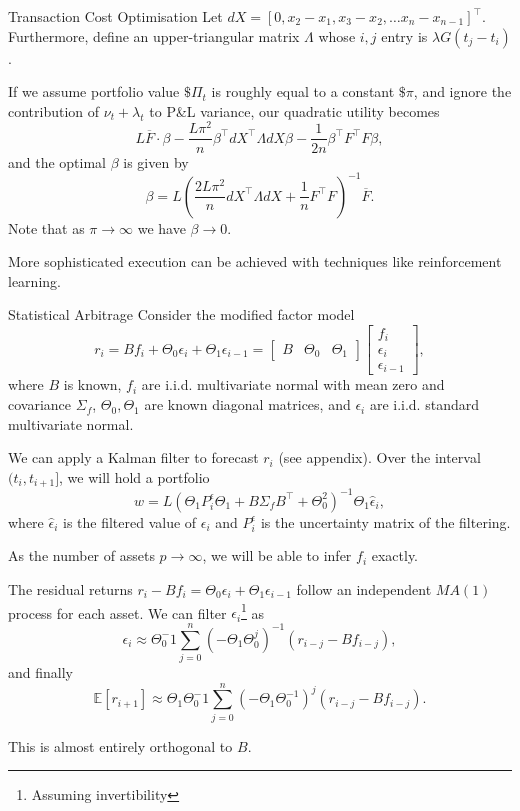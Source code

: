 \documentclass{beamer}
\begin{document}
\begin{frame}{Transaction Cost Optimisation}
	Let $dX = [0,x_2-x_1,x_3-x_2,\ldots x_n-x_{n-1}]^\top$. Furthermore, define an upper-triangular matrix $\Lambda$ whose $i,j$ entry is $\lambda G(t_j-t_i)$.

	If we assume portfolio value $\$\Pi_t$ is roughly equal to a constant $\$\pi$, and ignore the contribution of $\nu_t+\lambda_t$ to P\&L variance, our quadratic utility becomes
	$$L\overline{F} \cdot \beta - \frac{L\pi^2}{n}\beta^\top dX^\top \Lambda dX\beta - \frac{1}{2n}\beta^\top F^\top F\beta,$$
	and the optimal $\beta$ is given by
	$$\beta = L\left(\frac{2L\pi^2}{n} dX^\top \Lambda dX + \frac{1}{n}F^\top F\right)^{-1}\overline{F}.$$
	Note that as $\pi\to\infty$ we have $\beta\to 0$.

	More sophisticated execution can be achieved with techniques like reinforcement learning.
\end{frame}

\begin{frame}{Statistical Arbitrage}
	Consider the modified factor model
	$$r_i = Bf_i + \Theta_0\epsilon_i + \Theta_1\epsilon_{i-1} = \left[\begin{matrix}B & \Theta_0 & \Theta_1\end{matrix}\right]\left[\begin{matrix}f_i \\ \epsilon_i \\ \epsilon_{i-1}\end{matrix}\right],$$
	where $B$ is known, $f_i$ are i.i.d. multivariate normal with mean zero and covariance $\Sigma_f$, $\Theta_0,\Theta_1$ are known diagonal matrices, and $\epsilon_i$ are i.i.d. standard multivariate normal.

	We can apply a Kalman filter to forecast $r_i$ (see appendix). Over the interval $(t_i,t_{i+1}]$, we will hold a portfolio
	$$w = L(\Theta_1 P^\epsilon_i \Theta_1 + B\Sigma_f B^\top + \Theta_0^2)^{-1} \Theta_1\hat{\epsilon}_i,$$
	where $\hat{\epsilon}_i$ is the filtered value of $\epsilon_i$ and $P^\epsilon_i$ is the uncertainty matrix of the filtering.

	As the number of assets $p\to\infty$, we will be able to infer $f_i$ exactly.

	The residual returns $r_i-Bf_i = \Theta_0\epsilon_i + \Theta_1 \epsilon_{i-1}$ follow an independent $MA(1)$ process for each asset. We can filter $\epsilon_i$\footnote{Assuming invertibility} as
	$$\epsilon_i \approx \Theta_0^-1 \sum_{j=0}^n \left(-\Theta_1\Theta_0^j\right)^{-1}(r_{i-j}-Bf_{i-j}),$$
	and finally
	$$\mathbb{E}[r_{i+1}] \approx \Theta_1\Theta_0^-1 \sum_{j=0}^n \left(-\Theta_1\Theta_0^{-1}\right)^j(r_{i-j}-Bf_{i-j}).$$

	This is almost entirely orthogonal to $B$.
\end{frame}
\end{document}
